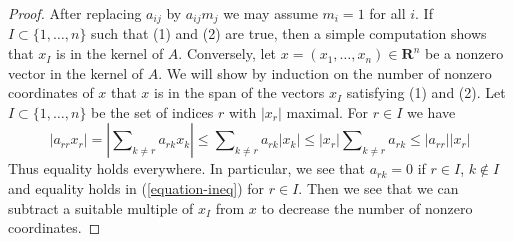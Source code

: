\documentclass[10pt,a4paper]{amsart}
\theoremstyle{plain}
\theoremstyle{definition}
\theoremstyle{remark}
\numberwithin{equation}{subsection}
\begin{document}
\begin{proof}
After replacing $a_{ij}$ by $a_{ij}m_j$ we may assume $m_i = 1$ for all $i$.
If $I \subset \{1, \ldots, n\}$ such that (1) and (2) are true,
then a simple computation shows that $x_I$ is in the kernel of $A$.
Conversely, let $x = (x_1, \ldots, x_n) \in \mathbf{R}^n$ be a
nonzero vector in the kernel of $A$. We will show by induction
on the number of nonzero coordinates of $x$ that $x$ is in the
span of the vectors $x_I$ satisfying (1) and (2). Let
$I \subset \{1, \ldots, n\}$ be the set of indices $r$ with $|x_r|$ maximal.
For $r \in I$ we have
$$
|a_{rr} x_r| = |\sum\nolimits_{k \not = r} a_{rk}x_k| \leq
\sum\nolimits_{k \not = r} a_{rk}|x_k| \leq
|x_r| \sum\nolimits_{k \not = r} a_{rk} \leq |a_{rr}||x_r|
$$
Thus equality holds everywhere. In particular, we see that
$a_{rk} = 0$ if $r \in I$, $k \not \in I$ and equality holds
in (\ref{equation-ineq}) for $r \in I$. Then we see that we
can subtract a suitable multiple of $x_I$ from $x$ to decrease
the number of nonzero coordinates.
\end{proof}
\end{document}
